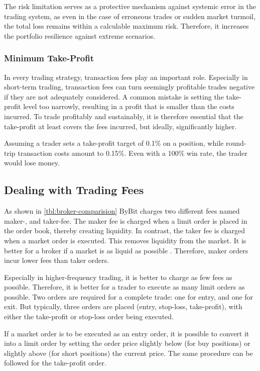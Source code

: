 The risk limitation serves as a protective mechanism against systemic error in the trading system, as even in the case of erroneous trades or sudden market turmoil, the total loss remains within a calculable maximum risk.
Therefore, it increases the portfolio resilience against extreme scenarios.

\subsubsection{Minimum Take-Profit}

In every trading strategy, transaction fees play an important role.
Especially in short-term trading, transaction fees can turn seemingly profitable trades negative if they are not adequately considered.
A common mistake is setting the take-profit level too narrowly, resulting in a profit that is smaller than the costs incurred.
To trade profitably and sustainably, it is therefore essential that the take-profit at least covers the fees incurred, but ideally, significantly higher.

Assuming a trader sets a take-profit target of 0.1\% on a position, while round-trip transaction costs amount to 0.15\%.
Even with a 100\% win rate, the trader would lose money.

\subsection{Dealing with Trading Fees}
\label{chap:dealing-with-trading-fees}

As shown in \autoref{tbl:broker-comparision} ByBit charges two different fees named maker-, and taker-fee.
The maker fee is charged when a limit order is placed in the order book, thereby creating liquidity.
In contrast, the taker fee is charged when a market order is executed.
This removes liquidity from the market.
It is better for a broker if a market is as liquid as possible \cite{liquid-markets}.
Therefore, maker orders incur lower fees than taker orders.

Especially in higher-frequency trading, it is better to charge as few fees as possible.
Therefore, it is better for a trader to execute as many limit orders as possible.
Two orders are required for a complete trade: one for entry, and one for exit.
But typically, three orders are placed (entry, stop-loss, take-profit), with either the take-profit or stop-loss order being executed.

If a market order is to be executed as an entry order, it is possible to convert it into a limit order by setting the order price slightly below (for buy positions) or slightly above (for short positions) the current price.
The same procedure can be followed for the take-profit order.

